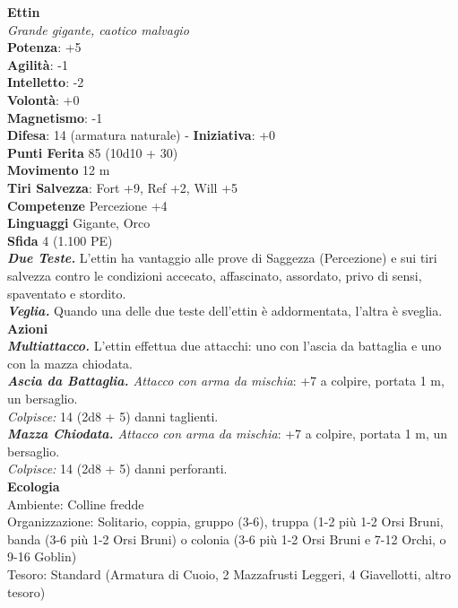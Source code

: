 \begin{multicols}{2}
\medskip\textbf{Ettin}\\
\emph{Grande gigante, caotico malvagio}\\
\textbf{Potenza}: +5\\
\textbf{Agilità}: -1\\
\textbf{Intelletto}: -2\\
\textbf{Volontà}: +0\\
\textbf{Magnetismo}: -1\\
\textbf{Difesa}: 14 (armatura naturale) - \textbf{Iniziativa}: +0\\
\textbf{Punti Ferita} 85 (10d10 + 30)\\
\textbf{Movimento} 12 m\\
\textbf{Tiri Salvezza}: Fort +9, Ref +2, Will +5\\
\textbf{Competenze} Percezione +4\\
\textbf{Linguaggi} Gigante, Orco\\
\textbf{Sfida} 4 (1.100 PE)\smallskip\\
\emph{\textbf{Due Teste.}} L'ettin ha vantaggio alle prove di Saggezza (Percezione) e sui tiri salvezza contro le condizioni accecato, affascinato, assordato, privo di sensi, spaventato e stordito. \\
\emph{\textbf{Veglia.}} Quando una delle due teste dell'ettin è addormentata, l'altra è sveglia.\\
\smallskip\textbf{Azioni} \\
\emph{\textbf{Multiattacco.}} L'ettin effettua due attacchi: uno con l'ascia da battaglia e uno con la mazza chiodata.\\
\emph{\textbf{Ascia da Battaglia.} Attacco con arma da mischia}: +7 a colpire, portata 1 m, un bersaglio.\\
\emph{Colpisce:} 14 (2d8 + 5) danni taglienti.\\
\emph{\textbf{Mazza Chiodata.} Attacco con arma da mischia}: +7 a colpire, portata 1 m, un bersaglio.\\
\emph{Colpisce:} 14 (2d8 + 5) danni perforanti.\\
\textbf{Ecologia}\\
Ambiente: Colline fredde\\
Organizzazione: Solitario, coppia, gruppo (3-6), truppa (1-2 più 1-2 Orsi Bruni, banda (3-6 più 1-2 Orsi Bruni) o colonia (3-6 più 1-2 Orsi Bruni e 7-12 Orchi, o 9-16 Goblin)\\
Tesoro: Standard (Armatura di Cuoio, 2 Mazzafrusti Leggeri, 4 Giavellotti, altro tesoro)\\

\end{multicols}
